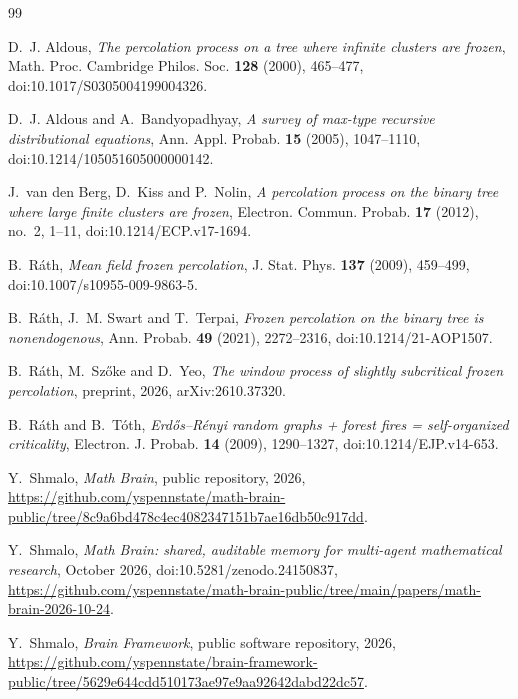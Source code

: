 \documentclass[11pt]{amsart}
\theoremstyle{remark}
\numberwithin{equation}{section}
\begin{document}
\begin{thebibliography}{99}

D.~J. Aldous, \emph{The percolation process on a tree where infinite
clusters are frozen}, Math. Proc. Cambridge Philos. Soc. \textbf{128}
(2000), 465--477, doi:10.1017/S0305004199004326.

D.~J. Aldous and A.~Bandyopadhyay, \emph{A survey of max-type recursive
distributional equations}, Ann. Appl. Probab. \textbf{15} (2005),
1047--1110, doi:10.1214/105051605000000142.

J.~van den Berg, D.~Kiss and P.~Nolin, \emph{A percolation process on the
binary tree where large finite clusters are frozen}, Electron. Commun.
Probab. \textbf{17} (2012), no.~2, 1--11, doi:10.1214/ECP.v17-1694.

B.~Ráth, \emph{Mean field frozen percolation}, J. Stat. Phys.
\textbf{137} (2009), 459--499, doi:10.1007/s10955-009-9863-5.

B.~Ráth, J.~M. Swart and T.~Terpai, \emph{Frozen percolation on the
binary tree is nonendogenous}, Ann. Probab. \textbf{49} (2021),
2272--2316, doi:10.1214/21-AOP1507.

B.~Ráth, M.~Szőke and D.~Yeo, \emph{The window process of slightly
subcritical frozen percolation}, preprint, 2026, arXiv:2610.37320.

B.~Ráth and B.~Tóth, \emph{Erd\H{o}s--Rényi random graphs + forest fires =
self-organized criticality}, Electron. J. Probab. \textbf{14} (2009),
1290--1327, doi:10.1214/EJP.v14-653.

 Y.~Shmalo, \emph{Math Brain}, public repository, 2026, \url{https://github.com/yspennstate/math-brain-public/tree/8c9a6bd478c4ec4082347151b7ae16db50c917dd}.

 Y.~Shmalo, \emph{Math Brain: shared, auditable memory for multi-agent mathematical research}, October 2026, doi:10.5281/zenodo.24150837,
\url{https://github.com/yspennstate/math-brain-public/tree/main/papers/math-brain-2026-10-24}.

 Y.~Shmalo, \emph{Brain Framework}, public software repository, 2026, \url{https://github.com/yspennstate/brain-framework-public/tree/5629e644cdd510173ae97e9aa92642dabd22dc57}.

\end{thebibliography}
\end{document}

